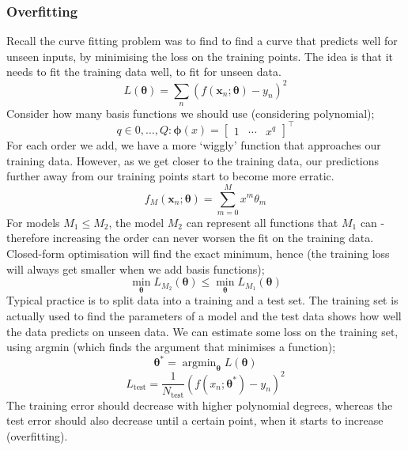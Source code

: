 \documentclass[a4paper, 12pt]{article}
\newcommand{\summation}[2]{\sum\limits_{#1}^{#2}}
\renewcommand{\vec}[1]{\boldsymbol{#1}}
\DeclareMathOperator*{\argmin}{argmin}
\begin{document}
            \subsubsection*{Overfitting}
                Recall the curve fitting problem was to find to find a curve that predicts well for unseen inputs, by minimising the loss on the training points.
                The idea is that it needs to fit the training data well, to fit for unseen data.
                $$L(\vec{\theta}) = \summation{n}{} (f(\vec{x}_n; \vec{\theta}) - y_n)^2$$
                Consider how many basis functions we should use (considering polynomial);
                $$q \in 0, \dots, Q: \vec{\phi}(x) = \begin{bmatrix}
                    1 & \cdots & x^q
                \end{bmatrix}^\top$$
                For each order we add, we have a more `wiggly' function that approaches our training data.
                However, as we get closer to the training data, our predictions further away from our training points start to become more erratic.
                $$f_M(\vec{x}_n; \vec{\theta}) = \summation{m = 0}{M} x^m \theta_m$$
                For models $M_1 \leq M_2$, the model $M_2$ can represent all functions that $M_1$ can - therefore increasing the order can never worsen the fit on the training data.
                Closed-form optimisation will find the exact minimum, hence (the training loss will always get smaller when we add basis functions);
                $$\min_{\vec{\theta}}L_{M_2}(\vec{\theta}) \leq \min_{\vec{\theta}}L_{M_1}(\vec{\theta})$$
                Typical practice is to split data into a training and a test set.
                The training set is actually used to find the parameters of a model and the test data shows how well the data predicts on unseen data.
                We can estimate some loss on the training set, using argmin (which finds the argument that minimises a function);
                $$\vec{\theta^*} = \argmin_{\vec{\theta}}L(\vec{\theta})$$
                $$L_\text{test} = \frac{1}{N_\text{test}}(f(x_n; \vec{\theta^*}) - y_n)^2$$
                The training error should decrease with higher polynomial degrees, whereas the test error should also decrease until a certain point, when it starts to increase (overfitting).
\end{document}
